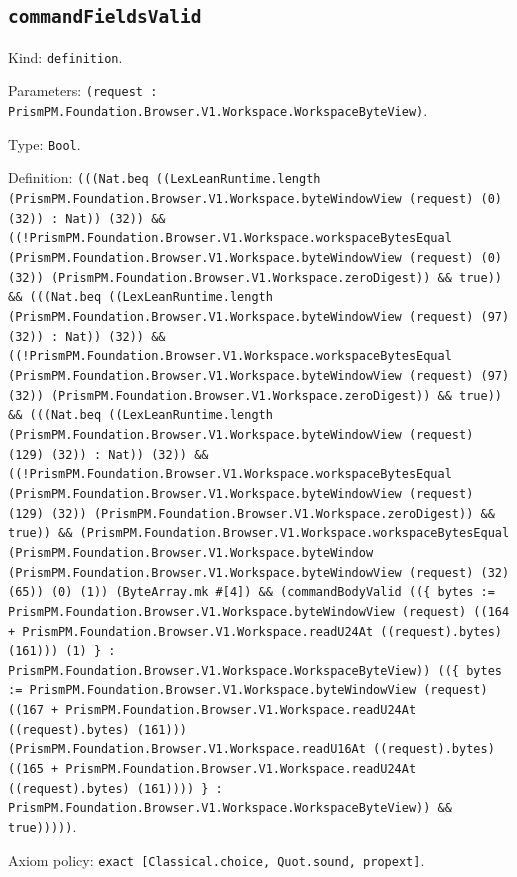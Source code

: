 \documentclass[11pt]{article}
\begin{document}
\subsection*{\texttt{commandFieldsValid}}
\noindent Kind: \texttt{definition}.\par
\noindent Parameters: \texttt{(request : PrismPM.Foundation.Browser.V1.Workspace.WorkspaceByteView)}.\par
\noindent Type: \texttt{Bool}.\par
\noindent Definition: \texttt{(((Nat.beq ((LexLeanRuntime.length (PrismPM.Foundation.Browser.V1.Workspace.byteWindowView (request) (0) (32)) : Nat)) (32)) \&\& ((!PrismPM.Foundation.Browser.V1.Workspace.workspaceBytesEqual (PrismPM.Foundation.Browser.V1.Workspace.byteWindowView (request) (0) (32)) (PrismPM.Foundation.Browser.V1.Workspace.zeroDigest)) \&\& true)) \&\& (((Nat.beq ((LexLeanRuntime.length (PrismPM.Foundation.Browser.V1.Workspace.byteWindowView (request) (97) (32)) : Nat)) (32)) \&\& ((!PrismPM.Foundation.Browser.V1.Workspace.workspaceBytesEqual (PrismPM.Foundation.Browser.V1.Workspace.byteWindowView (request) (97) (32)) (PrismPM.Foundation.Browser.V1.Workspace.zeroDigest)) \&\& true)) \&\& (((Nat.beq ((LexLeanRuntime.length (PrismPM.Foundation.Browser.V1.Workspace.byteWindowView (request) (129) (32)) : Nat)) (32)) \&\& ((!PrismPM.Foundation.Browser.V1.Workspace.workspaceBytesEqual (PrismPM.Foundation.Browser.V1.Workspace.byteWindowView (request) (129) (32)) (PrismPM.Foundation.Browser.V1.Workspace.zeroDigest)) \&\& true)) \&\& (PrismPM.Foundation.Browser.V1.Workspace.workspaceBytesEqual (PrismPM.Foundation.Browser.V1.Workspace.byteWindow (PrismPM.Foundation.Browser.V1.Workspace.byteWindowView (request) (32) (65)) (0) (1)) (ByteArray.mk \#[4]) \&\& (commandBodyValid ((\{ bytes := PrismPM.Foundation.Browser.V1.Workspace.byteWindowView (request) ((164 + PrismPM.Foundation.Browser.V1.Workspace.readU24At ((request).bytes) (161))) (1) \} : PrismPM.Foundation.Browser.V1.Workspace.WorkspaceByteView)) ((\{ bytes := PrismPM.Foundation.Browser.V1.Workspace.byteWindowView (request) ((167 + PrismPM.Foundation.Browser.V1.Workspace.readU24At ((request).bytes) (161))) (PrismPM.Foundation.Browser.V1.Workspace.readU16At ((request).bytes) ((165 + PrismPM.Foundation.Browser.V1.Workspace.readU24At ((request).bytes) (161)))) \} : PrismPM.Foundation.Browser.V1.Workspace.WorkspaceByteView)) \&\& true)))))}.\par
\noindent Axiom policy: \texttt{exact [Classical.choice, Quot.sound, propext]}.\par
\end{document}
